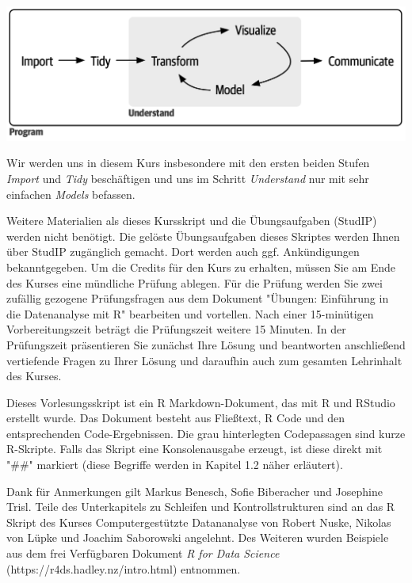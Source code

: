 \begin{titlepage}
\includegraphics{img/data_science_steps.png}

Wir werden uns in diesem Kurs insbesondere mit den ersten beiden Stufen \textit{Import} und \textit{Tidy} beschäftigen und uns im Schritt \textit{Understand} nur mit sehr einfachen \textit{Models} befassen.

Weitere Materialien als dieses Kursskript und die Übungsaufgaben (StudIP) werden nicht benötigt. Die gelöste Übungsaufgaben dieses Skriptes werden Ihnen über StudIP zugänglich gemacht. Dort werden auch ggf. Ankündigungen bekanntgegeben. Um die Credits für den Kurs zu erhalten, müssen Sie am Ende des Kurses eine mündliche Prüfung ablegen. Für die Prüfung werden Sie zwei zufällig gezogene Prüfungsfragen aus dem Dokument "Übungen: Einführung in die Datenanalyse mit R" bearbeiten und vortellen.  Nach einer 15-minütigen Vorbereitungszeit beträgt die Prüfungszeit weitere 15 Minuten. In der Prüfungszeit präsentieren Sie zunächst Ihre Lösung und beantworten anschließend vertiefende Fragen zu Ihrer Lösung und daraufhin auch zum gesamten Lehrinhalt des Kurses.

Dieses Vorlesungsskript ist ein R Markdown-Dokument, das mit R und RStudio erstellt wurde. Das Dokument besteht aus Fließtext, R Code und den entsprechenden Code-Ergebnissen. Die grau hinterlegten Codepassagen sind kurze R-Skripte. Falls das Skript eine Konsolenausgabe erzeugt, ist diese direkt mit "\#\#" markiert (diese Begriffe werden in Kapitel 1.2 näher erläutert).

Dank für Anmerkungen gilt Markus Benesch, Sofie Biberacher und Josephine Trisl.
Teile des Unterkapitels zu Schleifen und Kontrollstrukturen sind an das R Skript des Kurses Computergestützte Datananalyse von Robert Nuske, Nikolas von Lüpke und Joachim Saborowski angelehnt. Des Weiteren wurden Beispiele aus dem frei Verfügbaren Dokument \textit{R for Data Science} (https://r4ds.hadley.nz/intro.html) entnommen.
\end{titlepage}

